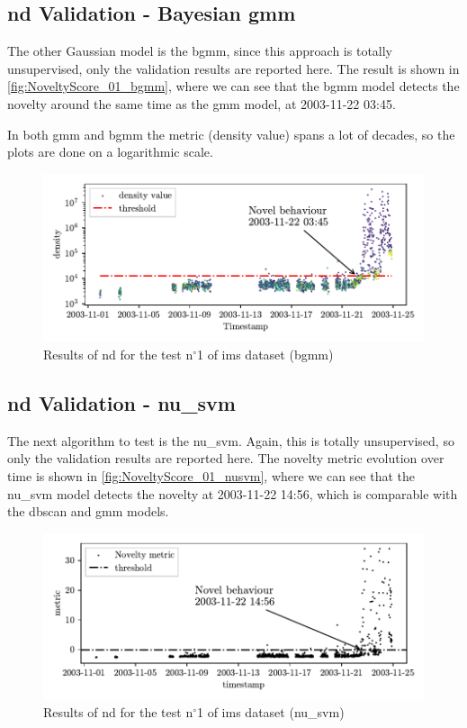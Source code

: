 \subsection{\gls{nd} Validation - Bayesian \gls{gmm}}
The other Gaussian model is the \gls{bgmm}, since this approach is totally unsupervised, only the validation results are reported here. The result is shown in \autoref{fig:NoveltyScore_01_bgmm}, where we can see that the \gls{bgmm} model detects the novelty around the same time as the \gls{gmm} model, at 2003-11-22 03:45.

In both \gls{gmm} and \gls{bgmm} the metric (density value) spans a lot of decades, so the plots are done on a logarithmic scale.

\begin{figure}
    \centering
    \includegraphics{images/IMS/Novelty_01_500samples_bearing3x_GMM_bayesan.pdf}
    \caption{Results of \gls{nd} for the test $\text{n}^\circ$1 of \gls{ims} dataset (\gls{bgmm})}
    \label{fig:NoveltyScore_01_bgmm}
\end{figure}

\subsection{\gls{nd} Validation - \gls{nu_svm}}
The next algorithm to test is the \gls{nu_svm}. Again, this is totally unsupervised, so only the validation results are reported here. The novelty metric evolution over time is shown in \autoref{fig:NoveltyScore_01_nusvm}, where we can see that the \gls{nu_svm} model detects the novelty at 2003-11-22 14:56, which is comparable with the \gls{dbscan} and \gls{gmm} models.

\begin{figure}
    \centering
    \includegraphics{images/IMS/Novelty_01_500samples_bearing3x_nusvm.pdf}
    \caption{Results of \gls{nd} for the test $\text{n}^\circ$1 of \gls{ims} dataset (\gls{nu_svm})}
    \label{fig:NoveltyScore_01_nusvm}
\end{figure}

